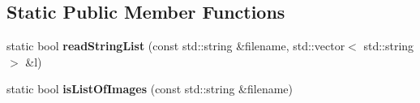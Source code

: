 \subsection*{Static Public Member Functions}
\begin{DoxyCompactItemize}
\item 
\mbox{\label{class_settings_a67f01f62ca469d9ed75794079eb53c9d}} 
static bool {\bfseries read\+String\+List} (const std\+::string \&filename, std\+::vector$<$ std\+::string $>$ \&l)
\item 
\mbox{\label{class_settings_aa69f25fc79fe1dd05d990dade16669ea}} 
static bool {\bfseries is\+List\+Of\+Images} (const std\+::string \&filename)
\end{DoxyCompactItemize}
